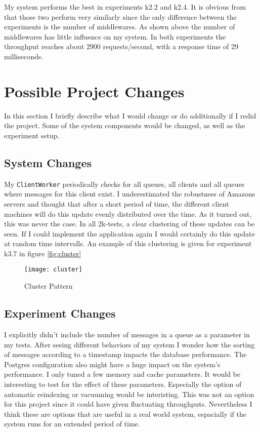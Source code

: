 \documentclass[
10pt, %
a4paper, %
oneside, %
headinclude,footinclude, %
BCOR5mm, %
]{scrartcl}
\begin{document}
My system performs the best in experiments k2.2 and k2.4. It is obvious from that those two perform very similarly since the only difference between the experiments is the number of middlewares. As shown above the number of middlewares has little influence on my system. In both experiments the throughput reaches about 2900 requests/second, with a response time of 29 milliseconds.

\section{Possible Project Changes}
In this section I briefly describe what I would change or do additionally if I redid the project. Some of the system components would be changed, as well as the experiment setup.
\subsection{System Changes}
\label{changes}
My \texttt{ClientWorker} periodically checks for all queues, all clients and all queues where messages for this client exist. I underestimated the robustness of Amazons servers and thought that after a short period of time, the different client machines will do this update evenly distributed over the time. As it turned out, this was never the case. In all 2k-tests, a clear clustering of these updates can be seen. If I could implement the application again I would certainly do this update at random time intervalls. An example of this clustering is given for experiment k3.7 in figure \vref{fig:cluster}

\begin{figure}[H]
\centering
\texttt{[image: cluster]}
\caption{Cluster Pattern}
\label{fig:cluster}
\end{figure}


\subsection{Experiment Changes}
I explicitly didn't include the number of messages in a queue as a parameter in my tests. After seeing different behaviors of my system I wonder how the sorting of messages according to a timestamp impacts the database performance.  
The Postgres configuration also might have a huge impact on the system's performance. I only tuned a few memory and cache parameters. It would be interesting to test for the effect of these parameters. Especially the option of automatic reindexing or vacuuming would be interisting. This was not an option for this project since it could have given fluctuating throughputs. Nevertheless I think these are options that are useful in a real world system, espacially if the system runs for an extended period of time.
\end{document}
